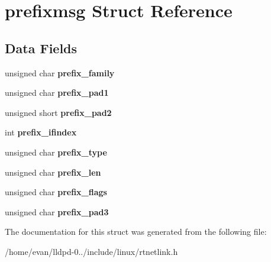 \section{prefixmsg \-Struct \-Reference}
\label{structprefixmsg}
\subsection*{\-Data \-Fields}
\begin{DoxyCompactItemize}
\item 
unsigned char {\bfseries prefix\-\_\-family}\label{structprefixmsg_ae308b8f126cbee082b9936b4abcbf7fe}

\item 
unsigned char {\bfseries prefix\-\_\-pad1}\label{structprefixmsg_a8d4241d1c1a9f40a7757fdb5fbf444c1}

\item 
unsigned short {\bfseries prefix\-\_\-pad2}\label{structprefixmsg_a21850e5d9030400bae09f042ba74d269}

\item 
int {\bfseries prefix\-\_\-ifindex}\label{structprefixmsg_aef4c73f93d37baa45c8a596cff3eda23}

\item 
unsigned char {\bfseries prefix\-\_\-type}\label{structprefixmsg_a56da616dbae23b55091740c076e44686}

\item 
unsigned char {\bfseries prefix\-\_\-len}\label{structprefixmsg_a4ec38400a3e77be78bbb76a06e5ba093}

\item 
unsigned char {\bfseries prefix\-\_\-flags}\label{structprefixmsg_a8952f4f50a263c70747a6b8e1c27771b}

\item 
unsigned char {\bfseries prefix\-\_\-pad3}\label{structprefixmsg_a76514fbdc89ea6a6b196a59de9d1c538}

\end{DoxyCompactItemize}


\-The documentation for this struct was generated from the following file\-:\begin{DoxyCompactItemize}
\item 
/home/evan/lldpd-\/0../include/linux/rtnetlink.\-h\end{DoxyCompactItemize}
